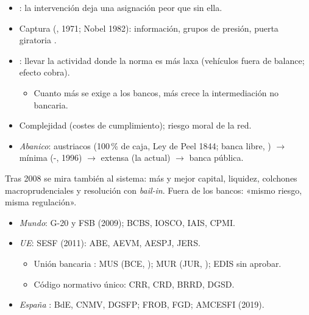 \documentclass{article}
\begin{document}
\begin{columnas}
\begin{itemize}
\item {}: la intervención deja una asignación peor que sin ella.
\item Captura (, 1971; Nobel 1982): información, grupos de presión, puerta giratoria .
\item {}: llevar la actividad donde la norma es más laxa (vehículos fuera de balance; efecto cobra).
  \begin{itemize}
  \item Cuanto más se exige a los bancos, más crece la intermediación no bancaria.
  \end{itemize}
\item Complejidad (costes de cumplimiento); riesgo moral de la red.
\item \emph{Abanico}: austriacos (100\,\% de caja, Ley de Peel 1844; banca libre, ) $\to$ mínima (-, 1996) $\to$ extensa (la actual) $\to$ banca pública.
\end{itemize}

\begin{ideaclave}
Tras 2008 se mira también al sistema: más y mejor capital, liquidez, colchones macroprudenciales y resolución con \emph{bail-in}. Fuera de los bancos: «mismo riesgo, misma regulación».
\end{ideaclave}

\begin{itemize}
\item \emph{Mundo}: G-20 y FSB (2009); BCBS, IOSCO, IAIS, CPMI.
\item \emph{UE}: SESF (2011): ABE, AEVM, AESPJ, JERS.
  \begin{itemize}
  \item Unión bancaria : MUS (BCE, ); MUR (JUR, ); EDIS sin aprobar.
  \item Código normativo único: CRR, CRD, BRRD, DGSD.
  \end{itemize}
\item \emph{España} : BdE, CNMV, DGSFP; FROB, FGD; AMCESFI (2019).
\end{itemize}


\end{columnas}
\end{document}
